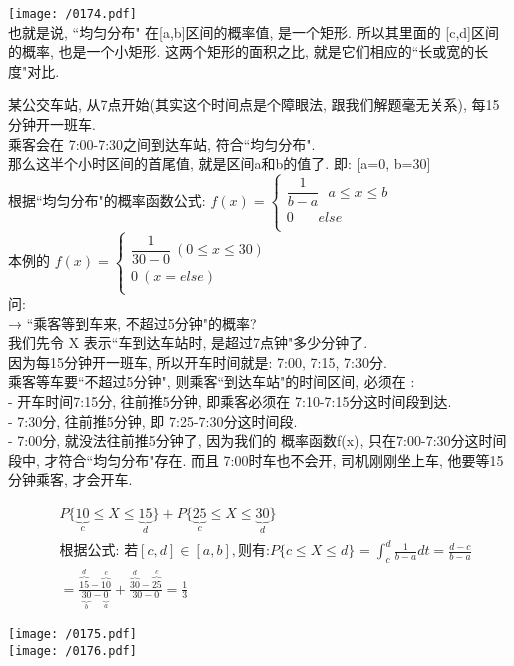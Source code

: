 \documentclass[UTF8]{ctexart}
\begin{document}
	\texttt{[image: /0174.pdf]} \\
	
	也就是说, ``均匀分布" 在[a,b]区间的概率值, 是一个矩形. 所以其里面的 [c,d]区间的概率, 也是一个小矩形. 这两个矩形的面积之比, 就是它们相应的``长或宽的长度"对比. \\
	
	
	\begin{myEnvSample}
	某公交车站, 从7点开始(其实这个时间点是个障眼法, 跟我们解题毫无关系), 每15分钟开一班车. \\
	乘客会在 7:00-7:30之间到达车站, 符合``均匀分布". \\
	那么这半个小时区间的首尾值, 就是区间a和b的值了. 	即: [a=0, b=30] \\
	根据``均匀分布"的概率函数公式:
	$f\left( x \right) =\left\{ \begin{array}{l}
		\dfrac{1}{b-a}\ \ \ a\leq x\leq b\\
		0\ \ \ \ \ \ \ \ else\\
	\end{array} \right. $ \\
	本例的 
	$f\left( x \right) =\left\{ \begin{array}{l}
		\dfrac{1}{30-0} \ (0\leq x\leq 30)\\
		0 \ (x=else)\\
	\end{array} \right. $ \\

	问: \\
	→ ``乘客等到车来, 不超过5分钟"的概率? \\
	我们先令 X 表示``车到达车站时, 是超过7点钟"多少分钟了. \\
	
	因为每15分钟开一班车, 所以开车时间就是: 7:00, 7:15, 7:30分. \\
	乘客等车要``不超过5分钟", 则乘客``到达车站"的时间区间, 必须在 : \\
	- 开车时间7:15分, 往前推5分钟, 即乘客必须在 7:10-7:15分这时间段到达. \\
	- 7:30分, 往前推5分钟, 即 7:25-7:30分这时间段. \\
	- 7:00分, 就没法往前推5分钟了, 因为我们的 概率函数f(x), 只在7:00-7:30分这时间段中, 才符合``均匀分布"存在. 而且 7:00时车也不会开, 司机刚刚坐上车, 他要等15分钟乘客, 才会开车.
	
	\begin{align*}  %
	&P\{\underset{c}{\underbrace{10}}\leq X\leq \underset{d}{\underbrace{15}}\}+P\{\underset{c}{\underbrace{25}}\leq X\leq \underset{d}{\underbrace{30}}\}\\
&\text{根据公式:\ 若}[c,d]\in \left[ a,b \right] ,\text{则有:}P\{c\leq X\leq d\}=\int_c^d{\frac{1}{b-a}}dt=\frac{d-c}{b-a}\\
&=\frac{\overset{d}{\overbrace{15}}-\overset{c}{\overbrace{10}}}{\underset{b}{\underbrace{30}}-\underset{a}{\underbrace{0}}}+\frac{\overset{d}{\overbrace{30}}-\overset{c}{\overbrace{25}}}{30-0}=\frac{1}{3}
	\end{align*}

	\texttt{[image: /0175.pdf]} \\
	
	\texttt{[image: /0176.pdf]} \\
	
	
	\end{myEnvSample}
	
	
\end{document}
